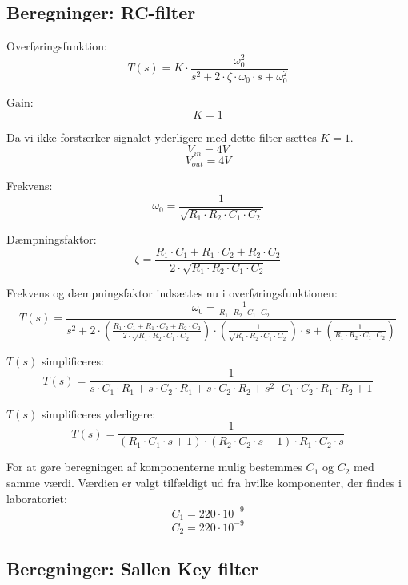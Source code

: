 \clearpage
  
\subsection{Beregninger: RC-filter} \label{RC-filter}
\vspace{0.2 cm}
Overføringsfunktion: 
\[ T(s)=K \cdot \frac{\omega_{0}^{2}}{{s^{2}+2 \cdot \zeta \cdot \omega_{0}\cdot s+\omega_{0}^{2}}} \]

Gain:
\[ K=1 \]



Da vi ikke forstærker signalet yderligere med dette filter sættes $K=1$.
\[ V_{in}=4V \]
\[ V_{out}=4V \]

Frekvens:
\[ \omega_{0}=\frac{1}{\sqrt{R_{1} \cdot R_{2} \cdot C_{1} \cdot C_{2}}} \]

Dæmpningsfaktor:
\[ \zeta= \frac{R_{1} \cdot C_{1} + R_{1} \cdot C_{2}+R_{2} \cdot C_{2}}{2 \cdot \sqrt{R_{1} \cdot R_{2} \cdot C_{1} \cdot C_{2}}} \]

Frekvens og dæmpningsfaktor indsættes nu i overføringsfunktionen:
\[ T(s)=\frac{\omega_{0}=\frac{1}{R_{1} \cdot R_{2} \cdot C_{1} \cdot C_{2}}}{s^{2}+2 \cdot (\frac{R_{1} \cdot C_{1} + R_{1} \cdot C_{2}+R_{2} \cdot C_{2}}{2 \cdot \sqrt{R_{1} \cdot R_{2} \cdot C_{1} \cdot C_{2}}}) \cdot (\frac{1}{\sqrt{R_{1} \cdot R_{2} \cdot C_{1} \cdot C_{2}}}) \cdot s + (\frac{1}{R_{1} \cdot R_{2} \cdot C_{1} \cdot C_{2}})}  \]

$T(s)$ simplificeres:
\[ T(s)=\frac{1}{s \cdot C_{1} \cdot R_{1} +s \cdot C_{2} \cdot R_{1}+s \cdot C_{2} \cdot R_{2}+s^{2}\cdot C_{1} \cdot C_{2} \cdot R_{1} \cdot R_{2} +1} \]

$T(s)$ simplificeres yderligere:
\[ T(s)=\frac{1}{(R_{1} \cdot C_{1} \cdot s+1) \cdot (R_{2} \cdot C_{2} \cdot s +1) \cdot R_{1} \cdot C_{2} \cdot s} \]

For at gøre beregningen af komponenterne mulig bestemmes $ C_{1} $ og $ C_{2} $ med samme værdi. Værdien er valgt tilfældigt ud fra hvilke komponenter, der findes i laboratoriet:
\[ C_{1} = 220 \cdot 10^{-9} \]
\[ C_{2} = 220 \cdot 10^{-9} \]


\subsection{Beregninger: Sallen Key filter}

